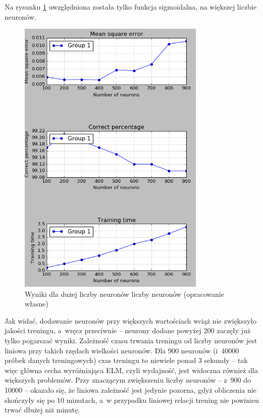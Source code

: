 \documentclass[pl]{minipw} %
\begin{document}
Na rysunku \ref{wyniki_dota2_python_performance} uwzględniona została tylko funkcja sigmoidalna, na większej liczbie neuronów.
\begin{figure}[H]
\centering
\includegraphics[width=0.8\textwidth]{wyniki_dota2_python_performance.png}
\caption[Wyniki dla dużej liczby neuronów liczby neuronów]{Wyniki dla dużej liczby neuronów liczby neuronów (opracowanie własne)}
\label{wyniki_dota2_python_performance}
\end{figure}
Jak widać, dodawanie neuronów przy większych wartościach wciąż nie zwiększyło jakości treningu, a~wręcz przeciwnie -- neurony dodane powyżej 200 zaczęły już tylko pogarszać wyniki. Zależność czasu trwania treningu od liczby neuronów jest liniowa przy takich rzędach wielkości neuronów. Dla 900 neuronów (i~40000 próbek danych treningowych) czas treningu to niewiele ponad 3 sekundy -- tak więc główna cecha wyróżniająca ELM, czyli wydajność, jest widoczna również dla większych problemów. Przy znaczącym zwiększeniu liczby neuronów -- z~900 do 10000 -- okazało się, że liniowa zależność jest jedynie pozorna, gdyż obliczenia nie skończyły się po 10 minutach, a~w przypadku liniowej relacji trening nie powinien trwać dłużej niż minutę.
\label{10000_dota2}
\end{document}

